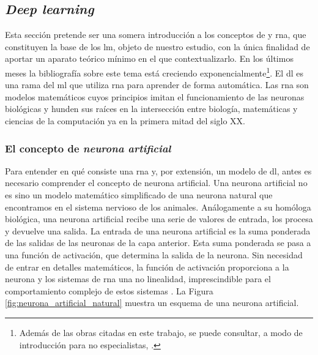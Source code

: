 \subsection{\emph{Deep learning}}

Esta sección pretende ser una somera introducción a los conceptos de  y \gls{rna}, que constituyen la base de los \gls{lm}, objeto de nuestro estudio, con la única finalidad de aportar un aparato teórico mínimo en el que contextualizarlo. En los últimos meses la bibliografía sobre este tema está creciendo exponencialmente\footnote{Además de las obras citadas en este trabajo, se puede consultar, a modo de introducción para no especialistas, \cite{BeginnerGuideNeural}.}. El \gls{dl} es una rama del \gls{ml} que utiliza \gls{rna} para aprender de forma automática. Las \gls{rna} son modelos matemáticos cuyos principios imitan el funcionamiento de las neuronas biológicas y hunden sus raíces en la intersección entre biología, matemáticas y ciencias de la computación ya en la primera mitad del siglo XX.

\subsubsection{El concepto de \emph{neurona artificial}}

Para entender en qué consiste una \gls{rna} y, por extensión, un modelo de \gls{dl}, antes es necesario comprender el concepto de neurona artificial. Una neurona artificial no es sino un modelo matemático simplificado de una neurona natural que encontramos en el sistema nervioso de los animales. Análogamente a su homóloga biológica, una neurona artificial recibe una serie de valores de entrada, los procesa y devuelve una salida. La entrada de una neurona artificial es la suma ponderada de las salidas de las neuronas de la capa anterior. Esta suma ponderada se pasa a una función de activación, que determina la salida de la neurona. Sin necesidad de entrar en detalles matemáticos, la función de activación proporciona a la neurona y los sistemas de \gls{rna} una no linealidad, imprescindible para el comportamiento complejo de estos sistemas \citep{torresivinalsPythonDeepLearning2020,zhang2023dive}. La Figura \ref{fig:neurona_artificial_natural} muestra un esquema de una neurona artificial.

